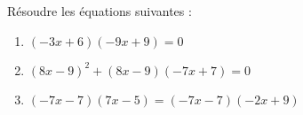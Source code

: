 \documentclass[a4paper,11pt,exos]{nsi} %
\begin{document}
\maketitle




\begin{exercice}
    Résoudre les équations suivantes :
        \begin{enumerate}
            \item $(-3x+6)(-9x+9)=0$
            \item $(8x-9)^{2}+(8x-9)(-7x+7)=0$ 
	        \item $(-7x-7)(7x-5)=(-7x-7)(-2x+9)$
        \end{enumerate}
    
\end{exercice}
\end{document}
